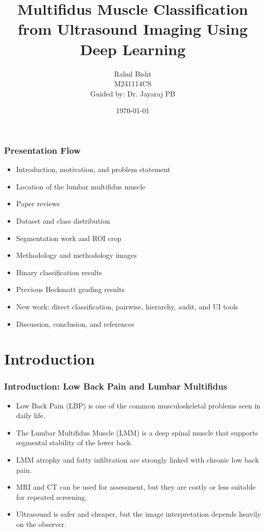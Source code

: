 \documentclass{beamer}
\title{Multifidus Muscle Classification from Ultrasound Imaging Using Deep Learning}
\author{Rahul Bisht \\ M241114CS \\ Guided by: Dr. Jayaraj PB}
\date{\today}
\begin{document}
\begin{frame}
\titlepage
\end{frame}

\begin{frame}
\frametitle{Presentation Flow}
\begin{itemize}
    \item Introduction, motivation, and problem statement
    \item Location of the lumbar multifidus muscle
    \item Paper reviews
    \item Dataset and class distribution
    \item Segmentation work and ROI crop
    \item Methodology and methodology images
    \item Binary classification results
    \item Previous Heckmatt grading results
    \item New work: direct classification, pairwise, hierarchy, audit, and UI tools
    \item Discussion, conclusion, and references
\end{itemize}
\end{frame}

\section{Introduction}

\begin{frame}
\frametitle{Introduction: Low Back Pain and Lumbar Multifidus}
\begin{itemize}
\item Low Back Pain (LBP) is one of the common musculoskeletal problems seen in daily life.
\item The Lumbar Multifidus Muscle (LMM) is a deep spinal muscle that supports segmental stability of the lower back.
\item LMM atrophy and fatty infiltration are strongly linked with chronic low back pain.
\item MRI and CT can be used for assessment, but they are costly or less suitable for repeated screening.
\item Ultrasound is safer and cheaper, but the image interpretation depends heavily on the observer.
\end{itemize}
\end{frame}
\end{document}
